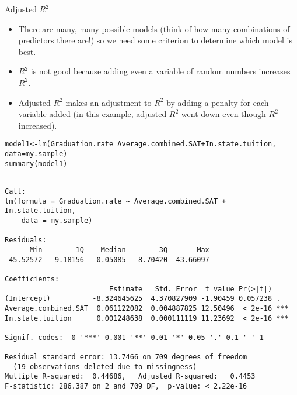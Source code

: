 \documentclass{beamer}\usepackage[]{graphicx}\usepackage[]{color}
\makeatletter
\newcommand{\hlopt}[1]{\textcolor[rgb]{1,0.894,0.769}{#1}}%
\newcommand{\hlstd}[1]{\textcolor[rgb]{1,0.894,0.769}{#1}}%
\newcommand{\hlkwb}[1]{\textcolor[rgb]{0.804,0.776,0.451}{#1}}%
\newcommand{\hlkwc}[1]{\textcolor[rgb]{0.78,0.941,0.545}{#1}}%
\newcommand{\hlkwd}[1]{\textcolor[rgb]{1,0.78,0.769}{#1}}%
\newenvironment{kframe}{%
 \def\at@end@of@kframe{}%
 \ifinner\ifhmode%
  \def\at@end@of@kframe{\end{minipage}}%
  \begin{minipage}{\columnwidth}%
 \fi\fi%
 \def\FrameCommand##1{\hskip\@totalleftmargin \hskip-\fboxsep
 \colorbox{shadecolor}{##1}\hskip-\fboxsep
     \hskip-\linewidth \hskip-\@totalleftmargin \hskip\columnwidth}%
 \MakeFramed {\advance\hsize-\width
   \@totalleftmargin\z@ \linewidth\hsize
   \@setminipage}}%
 {\par\unskip\endMakeFramed%
 \at@end@of@kframe}
\newenvironment{knitrout}{}{} %
\makeatother
\begin{document}
\begin{darkframes}
    \begin{frame}{Adjusted $R^2$}
      \begin{itemize}[<+->]
        \item There are many, many possible models (think of how many combinations of predictors there are!) so we need some criterion to determine which model is best.
        \item $R^2$ is not good because adding even a variable of random numbers increases $R^2$.
        \item \alert{Adjusted $R^2$} makes an adjustment to $R^2$ by adding a penalty for each variable added (in this example, adjusted $R^2$ went down even though $R^2$ increased).
      \end{itemize}
    \end{frame}

    \begin{frame}[fragile]
      
      \fontsize{8}{8}
\begin{knitrout}
\color{fgcolor}\begin{kframe}
\begin{alltt}
\hlstd{model1} \hlkwb{<-} \hlkwd{lm}\hlstd{(Graduation.rate} \hlopt{~} \hlstd{Average.combined.SAT} \hlopt{+} \hlstd{In.state.tuition,}
             \hlkwc{data}\hlstd{=my.sample)}
\hlkwd{summary}\hlstd{(model1)}
\end{alltt}
\begin{verbatim}

Call:
lm(formula = Graduation.rate ~ Average.combined.SAT + In.state.tuition, 
    data = my.sample)

Residuals:
      Min        1Q    Median        3Q       Max 
-45.52572  -9.18156   0.05085   8.70420  43.66097 

Coefficients:
                         Estimate   Std. Error  t value Pr(>|t|)    
(Intercept)          -8.324645625  4.370827909 -1.90459 0.057238 .  
Average.combined.SAT  0.061122082  0.004887825 12.50496  < 2e-16 ***
In.state.tuition      0.001248638  0.000111119 11.23692  < 2e-16 ***
---
Signif. codes:  0 '***' 0.001 '**' 0.01 '*' 0.05 '.' 0.1 ' ' 1

Residual standard error: 13.7466 on 709 degrees of freedom
  (19 observations deleted due to missingness)
Multiple R-squared:  0.44686,	Adjusted R-squared:   0.4453 
F-statistic: 286.387 on 2 and 709 DF,  p-value: < 2.22e-16
\end{verbatim}
\end{kframe}
\end{knitrout}
    \end{frame}


\end{darkframes}
\end{document}

